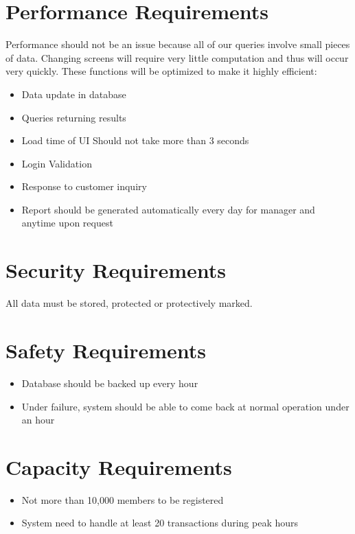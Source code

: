 \documentclass{scrreprt}
\begin{document}
\section{Performance Requirements}
Performance should not be an issue because all of our queries involve small pieces of
data. Changing screens will require very little computation and thus will occur very quickly.
These functions will be optimized to make it highly efficient:
\begin{itemize}
    \item Data update in database 
    \item Queries returning results 
    \item Load time of UI Should not take more than 3 seconds
    \item Login Validation 
    \item Response to customer inquiry 
    \item Report should be generated automatically every day for manager and anytime upon request
\end{itemize}

\section{Security Requirements}
All data must be stored, protected or protectively marked.

\section{Safety Requirements}
\begin{itemize}
    \item Database should be backed up every hour
    \item Under failure, system should be able to come back at normal operation under an hour
\end{itemize}

\section{Capacity Requirements}
\begin{itemize}
    \item Not more than 10,000 members to be registered
    \item System need to handle at least 20 transactions during peak hours
\end{itemize}
\end{document}
